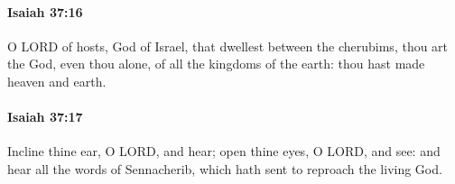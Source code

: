 		\paragraph{Isaiah 37:16} %
			\label{ISAIAH-37-16}

			O LORD of hosts, God of Israel, that dwellest between the cherubims, thou art the God, even thou alone, of all the kingdoms of the earth: thou hast made heaven and earth.


		\paragraph{Isaiah 37:17} %
			\label{ISAIAH-37-17}

			Incline thine ear, O LORD, and hear; open thine eyes, O LORD, and see: and hear all the words of Sennacherib, which hath sent to reproach the living God.


